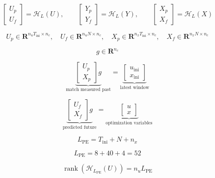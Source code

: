 \[
\begin{bmatrix}
U_p\\U_f
\end{bmatrix}
=\mathcal{H}_L(U),
\qquad
\begin{bmatrix}
Y_p\\Y_f
\end{bmatrix}
=\mathcal{H}_L(Y),
\qquad
\begin{bmatrix}
X_p\\X_f
\end{bmatrix}
=\mathcal{H}_L(X)
\]

\[
U_p\in\mathbf{R}^{n_uT_{\mathrm{ini}}\times n_c},
\quad
U_f\in\mathbf{R}^{n_uN\times n_c},
\quad
X_p\in\mathbf{R}^{n_xT_{\mathrm{ini}}\times n_c},
\quad
X_f\in\mathbf{R}^{n_xN\times n_c}
\]


\[
g\in\mathbf{R}^{n_c}
\]

\[
\underbrace{
\begin{bmatrix}
U_p\\X_p
\end{bmatrix}g
}_{\text{match measured past}}
=
\underbrace{
\begin{bmatrix}
u_{\mathrm{ini}}\\x_{\mathrm{ini}}
\end{bmatrix}
}_{\text{latest window}}
\]

\[
\underbrace{
\begin{bmatrix}
U_f\\X_f
\end{bmatrix}g
}_{\text{predicted future}}
=
\underbrace{
\begin{bmatrix}
u\\x
\end{bmatrix}
}_{\text{optimization variables}}
\]


\[
L_{\mathrm{PE}}=T_{\mathrm{ini}}+N+n_x
\]

\[
L_{\mathrm{PE}}=8+40+4=52
\]

\[
\operatorname{rank}\!\left(\mathcal{H}_{L_{\mathrm{PE}}}(U)\right)
=
n_u L_{\mathrm{PE}}
\]

